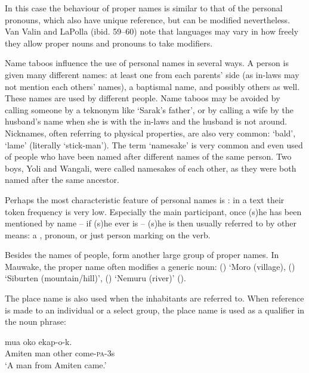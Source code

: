 In this case the behaviour of proper names is similar to that of the personal pronouns, which also have unique reference, but can be modified nevertheless. {Van Valin and LaPolla} (ibid. 59--60) note that languages may vary in how freely they allow proper nouns and pronouns to take modifiers.

Name taboos influence the use of personal names in several ways. A person is given many different names: at least one from each parents' side (as in-laws may not mention each others' names), a baptismal name, and possibly others as well. These names are used by different people. Name taboos may be avoided by calling someone by a teknonym like `Sarak's father', or by calling a wife by the husband's name when she is with the in-laws and the husband is not around. Nicknames, often referring to physical properties, are also very common:  `bald',  `lame' (literally `stick-man'). The term `namesake' is very common and even used of people who have been named after different names of the same person. Two boys, Yoli and Wangali, were called namesakes of each other, as they were both named after the same ancestor. 

Perhaps the most characteristic feature of personal names is : in a text their token frequency is very low. Especially the main participant, once (s)he has been mentioned by name -- if (s)he ever is -- (s)he is then usually referred to by other means: a , pronoun, or just person marking on the verb. 

Besides the names of people,  form another large group of proper names. In Mauwake, the proper name often modifies a generic noun:  () `Moro (village),  () `Siburten (mountain/hill)',  () `Nemuru (river)' (). 

The place name is also used when the inhabitants are referred to. When reference is made to an individual or a select group, the place name is used as a qualifier in the noun phrase: 

\ea%
\label{ex:3:x421}
\gll {}  mua oko ekap-o-k. \\
Amiten man other come-\textsc{pa}-3s\\
\glt`A man from Amiten came.'
\z

